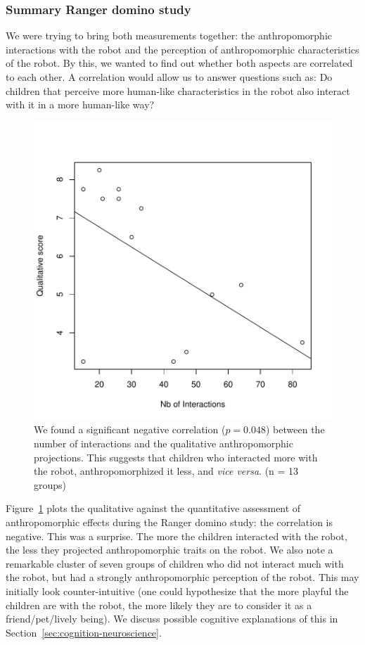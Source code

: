 \documentclass{frontiersSCNS} %
\begin{document}
\subsubsection{Summary Ranger domino study\\}

We were trying to bring both measurements together: the anthropomorphic 
interactions with the robot and the perception of anthropomorphic characteristics 
of the robot. By this, we wanted to find out whether both aspects are correlated to 
each other. A correlation would allow us to answer questions such as: Do children 
that perceive more human-like characteristics in the robot also interact with it in 
a more human-like way?


\begin{figure}
    \centering
    \includegraphics[width=0.5\columnwidth]{ranger-interactions-vs-qualitative-score}
    \caption{We found a significant negative correlation ($p=0.048$) between the
    number of interactions and the qualitative anthropomorphic projections. This 
    suggests that children who interacted more with the robot, anthropomorphized it 
    less, and \textit{vice versa}. (n = 13 groups)}
    \label{fig:qualitative-score}
\end{figure}

Figure~\ref{fig:qualitative-score} plots the qualitative against the quantitative assessment of
anthropomorphic effects during the Ranger domino study: the correlation is
negative. This was a surprise. The more the children interacted with the robot, the less they
projected anthropomorphic traits on the robot. We also note a remarkable cluster
of seven groups of children who did not interact much with the robot, but had a
strongly anthropomorphic perception of the robot. This may initially look
counter-intuitive (one could hypothesize that the more playful the children are
with the robot, the more likely they are to consider it as a friend/pet/lively
being). We discuss possible cognitive explanations of this in Section~\ref{sec:cognition-neuroscience}.
\end{document}
